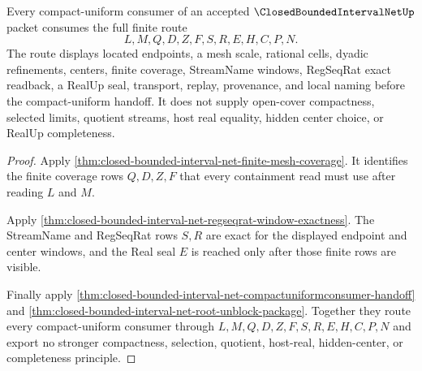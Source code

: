 \begin{theorem}
\label{thm:closed-bounded-interval-net-compact-uniform-route}
Every compact-uniform consumer of an accepted $\ClosedBoundedIntervalNetUp$ packet consumes the full finite route
$$
L,M,Q,D,Z,F,S,R,E,H,C,P,N.
$$
The route displays located endpoints, a mesh scale, rational cells, dyadic refinements, centers, finite coverage, StreamName windows, RegSeqRat exact readback, a RealUp seal, transport, replay, provenance, and local naming before the compact-uniform handoff. It does not supply open-cover compactness, selected limits, quotient streams, host real equality, hidden center choice, or RealUp completeness.
\end{theorem}
\begin{proof}
Apply \autoref{thm:closed-bounded-interval-net-finite-mesh-coverage}. It identifies the finite coverage rows $Q,D,Z,F$ that every containment read must use after reading $L$ and $M$.

Apply \autoref{thm:closed-bounded-interval-net-regseqrat-window-exactness}. The StreamName and RegSeqRat rows $S,R$ are exact for the displayed endpoint and center windows, and the Real seal $E$ is reached only after those finite rows are visible.

Finally apply \autoref{thm:closed-bounded-interval-net-compactuniformconsumer-handoff} and \autoref{thm:closed-bounded-interval-net-root-unblock-package}. Together they route every compact-uniform consumer through $L,M,Q,D,Z,F,S,R,E,H,C,P,N$ and export no stronger compactness, selection, quotient, host-real, hidden-center, or completeness principle.
\end{proof}

